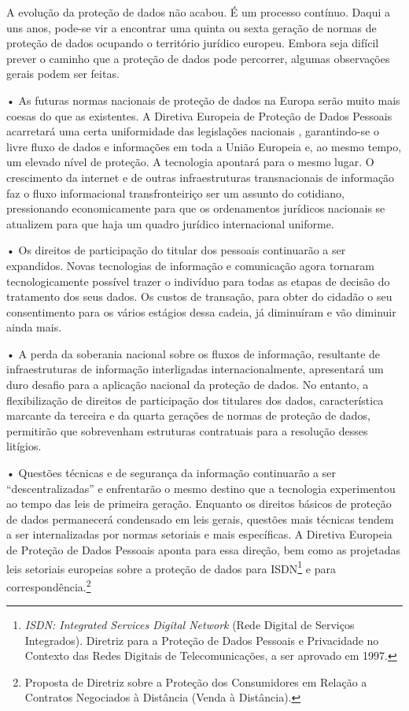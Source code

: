 A evolução da proteção de dados não acabou. É um processo contínuo.
Daqui a uns anos, pode-se vir a encontrar uma quinta ou sexta geração de
normas de proteção de dados ocupando o território jurídico europeu.
Embora seja difícil prever o caminho que a proteção de dados pode
percorrer, algumas observações gerais podem ser feitas.

• As futuras normas nacionais de proteção de dados na Europa serão muito
mais coesas do que as existentes. A Diretiva Europeia de Proteção de
Dados Pessoais acarretará uma certa uniformidade das legislações
nacionais , garantindo-se o livre fluxo de dados e informações em toda a
União Europeia e, ao mesmo tempo, um elevado nível de proteção. A
tecnologia apontará para o mesmo lugar. O crescimento da internet e de
outras infraestruturas transnacionais de informação faz o fluxo
informacional transfronteiriço ser um assunto do cotidiano, pressionando
economicamente para que os ordenamentos jurídicos nacionais se atualizem
para que haja um quadro jurídico internacional uniforme.

• Os direitos de participação do titular dos pessoais continuarão a ser
expandidos. Novas tecnologias de informação e comunicação agora tornaram
tecnologicamente possível trazer o indivíduo para todas as etapas de
decisão do tratamento dos seus dados. Os custos de transação, para obter
do cidadão o seu consentimento para os vários estágios dessa cadeia, já
diminuíram e vão diminuir ainda mais.

• A perda da soberania nacional sobre os fluxos de informação,
resultante de infraestruturas de informação interligadas
internacionalmente, apresentará um duro desafio para a aplicação
nacional da proteção de dados. No entanto, a flexibilização de direitos
de participação dos titulares dos dados, característica marcante da
terceira e da quarta gerações de normas de proteção de dados, permitirão
que sobrevenham estruturas contratuais para a resolução desses litígios.

• Questões técnicas e de segurança da informação continuarão a ser
``descentralizadas'' e enfrentarão o mesmo destino que a tecnologia
experimentou ao tempo das leis de primeira geração. Enquanto os direitos
básicos de proteção de dados permanecerá condensado em leis gerais,
questões mais técnicas tendem a ser internalizadas por normas setoriais
e mais específicas. A Diretiva Europeia de Proteção de Dados Pessoais
aponta para essa direção, bem como as projetadas leis setoriais
europeias sobre a proteção de dados para ISDN\footnote{\emph{ISDN:
  Integrated Services Digital Network} (Rede Digital de Serviços
  Integrados). Diretriz para a Proteção de Dados Pessoais e Privacidade
  no Contexto das Redes Digitais de Telecomunicações, a ser aprovado em
  1997.} e para correspondência.\footnote{Proposta de Diretriz sobre a
  Proteção dos Consumidores em Relação a Contratos Negociados à
  Distância (Venda à Distância).}


